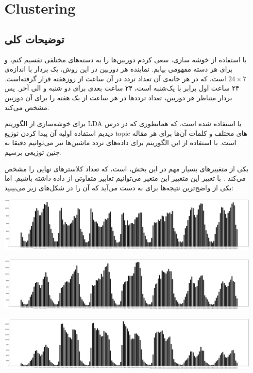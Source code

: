 \section{Clustering}

\subsection{توضیحات کلی}

با استفاده از خوشه‌ سازی، سعی کردم دوربین‌ها را به دسته‌های مختلفی تقسیم کنم، و برای 
هر دسته مفهومی بیابم. نماینده‌ هر دوربین در این روش، یک بردار با اندازه‌ی 
$24 \times 7$
است، که در هر خانه‌ی آن تعداد تردد در آن ساعت از روزهفته قرار گرفته‌است. ۲۴ ساعت اول 
برابر با یک‌شنبه است، ۲۴ ساعت بعدی برای دو شنبه و الی آخر. پس بردار 
متناظر هر دوربین، تعداد تردد‌ها در هر ساعت از یک هفته را برای آن دوربین 
مشخص می‌کند. 

برای خوشه‌سازی از الگوریتم 
LDA یا 
استفاده شده است، که همانطوری که در درس دیدیم استفاده اولیه آن پیدا کردن 
توزیع 
topic
های مختلف و کلمات آن‌ها برای هر مقاله است. با استفاده از این الگوریتم برای 
داده‌های تردد ماشین‌ها نیز می‌توانیم دقیقا به چنین توزیعی برسیم. 

یکی از متغییر‌های بسیار مهم در این بخش، 
است، که تعداد کلاستر‌های نهایی را مشخص می‌کند . با تغییر این متغییر این متغیر می‌توانیم تعابیر متفاوتی از داده‌ داشته باشیم. اما یکی از واضح‌ترین نتیجه‌‌ها برای
\mbox{}
به دست می‌آید که آن را در شکل‌های زیر می‌بینید: 

\includegraphics[scale=0.2]{images/clustering/1.png}

\includegraphics[scale=0.2]{images/clustering/2.png}

\includegraphics[scale=0.2]{images/clustering/3.png}


